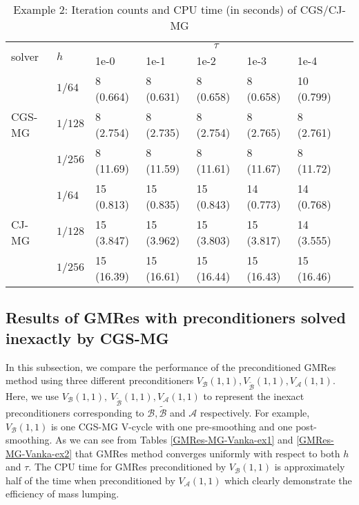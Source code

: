 \documentclass[smallcondensed]{svjour3}
\numberwithin{equation}{section} \numberwithin{table}{section}
\numberwithin{figure}{section}
\numberwithin{algorithm}{section}
\begin{document}
 \begin{table}
\caption{Example 2: Iteration counts and CPU time (in seconds) of CGS/CJ-MG}
\begin{center}
\begin{tabularx}{\linewidth}{m{25mm} *7{X}}
\hline
\multirow{2}{*}{solver} & \multirow{2}{*}{$h$} &\multicolumn{5}{c}{$\tau$} \\
                          \cline{3-7}
                                        &   &1e-0&1e-1&1e-2&1e-3&1e-4\\ 
\hline
\multirow{3}{*}{CGS-MG} & {$1/64$}  & 8 (0.664) & 8 (0.631)  & 8 (0.658)  &    8 (0.658) &    10 (0.799) \\
                                  & {$1/128$} & 8 (2.754)  & 8 (2.735)  & 8 (2.754)   &   8 (2.765)   &   8 (2.761) \\
				& {$1/256$}  & 8 (11.69)  & 8 (11.59)   & 8 (11.61)    &   8 (11.67)   &   8 (11.72) \\
\hline
\multirow{3}{*}{CJ-MG} &{$1/64$}& 15 (0.813)  & 15 (0.835)  & 15 (0.843) & 14 (0.773) & 14 (0.768)\\
			     &{$1/128$} & 15 (3.847) & 15 (3.962) & 15 (3.803) & 15 (3.817) & 14 (3.555)\\
			     & {$1/256$} &15 (16.39)  &  15 (16.61)  &  15 (16.44)  &  15 (16.43)  &  15 (16.46)\\
\hline
\end{tabularx}
\end{center}
\label{MGex2}
\end{table}

\subsection{Results of GMRes with preconditioners solved inexactly by CGS-MG}\label{section-results-cgs-mg}
\label{subsec:6.2}
In this subsection, we compare the performance of the preconditioned GMRes method using three different preconditioners $V_{\mathcal{B}}(1,1), V_{\tilde{\mathcal{B}}}(1,1), V_{\mathcal{A}}(1,1)$. Here, we use $V_{\mathcal{B}}(1,1),\ V_{\tilde{\mathcal{B}}}(1,1), V_{\mathcal{A}}(1,1)$ to represent the inexact preconditioners corresponding to $\mathcal{B},\tilde{\mathcal{B}}$ and $\mathcal{A}$ respectively. For example, $V_{\mathcal{B}}(1,1)$ is one CGS-MG V-cycle with one pre-smoothing and one post-smoothing. As we can see from Tables \ref{GMRes-MG-Vanka-ex1} and \ref{GMRes-MG-Vanka-ex2} that GMRes method converges uniformly with respect to both $h$ and $\tau$. The CPU time for GMRes preconditioned by $V_{\mathcal{B}}(1,1)$ is approximately half of the time when preconditioned by $V_{\mathcal{A}}(1,1)$ which clearly demonstrate the efficiency of mass lumping.
\end{document}
